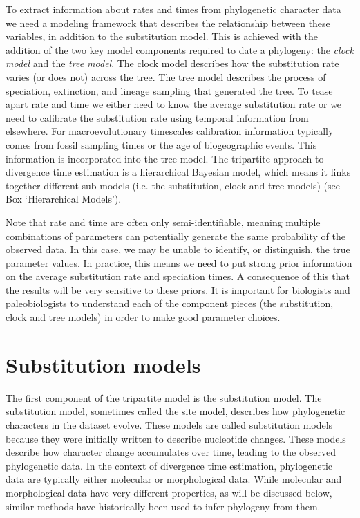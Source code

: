 To extract information about rates and times from phylogenetic character data we need a modeling framework that describes the  relationship between these variables, in addition to the substitution model.
This is achieved with the addition of the two key model components required to date a phylogeny: the \textit{clock model} and the \textit{tree model}.
The clock model describes how the substitution rate varies (or does not) across the tree.
The tree model describes the process of speciation, extinction, and lineage sampling that generated the tree.
To tease apart rate and time we either need to know the average substitution rate or we need to calibrate the substitution rate using temporal information from elsewhere.
For macroevolutionary timescales calibration information typically comes from fossil sampling times or the age of biogeographic events. This information is incorporated into the tree model.
The tripartite approach to divergence time estimation is a hierarchical Bayesian model, which means it links together different sub-models (i.e. the substitution, clock and tree models) (see Box `Hierarchical Models').

Note that rate and time are often only semi-identifiable, meaning multiple combinations of parameters can potentially generate the same probability of the observed data.
In this case, we may be unable to identify, or distinguish, the true parameter values.
In practice, this means we need to put strong prior information on the average substitution rate and speciation times. 
A consequence of this that the results will be very sensitive to these priors.
It is important for biologists and paleobiologists to understand each of the component pieces (the substitution, clock and tree models) in order to make good parameter choices.

\section{Substitution models}

The first component of the tripartite model is the substitution model.
The substitution model, sometimes called the site model, describes how phylogenetic characters in the dataset evolve.
These models are called substitution models because they were initially written to describe nucleotide changes.
These models describe how character change accumulates over time, leading to the observed phylogenetic data.
In the context of divergence time estimation, phylogenetic data are typically either molecular or morphological data. 
While molecular and morphological data have very different properties, as will be discussed below, similar methods have historically been used to infer phylogeny from them.

